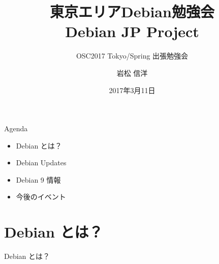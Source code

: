 \title{東京エリアDebian勉強会\\Debian JP Project}
\subtitle{OSC2017 Tokyo/Spring 出張勉強会}
\author{岩松 信洋}
\date{2017年3月11日}



\begin{frame}
\titlepage{}
\end{frame}

\begin{frame}{Agenda}
  \begin{itemize}
   \item Debian とは？
   \item Debian Updates
   \item Debian 9 情報
   \item 今後のイベント
  \end{itemize}
\end{frame}

\section{Debian とは？}
\begin{frame}\begin{center}\Huge{Debian とは？}\end{center}\end{frame}

